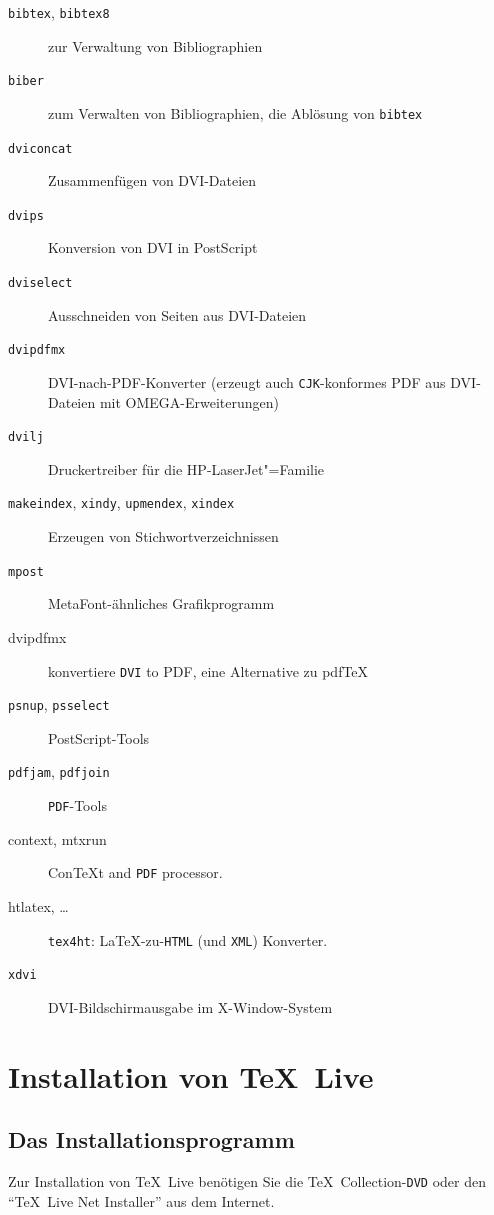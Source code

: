 \documentclass[12pt,ngerman,a4paper,fullparskip]{scrreprt}
\newcommand{\TL}{\TeX\ Live\xspace}
\newcommand{\acro}[1]{\texttt{#1}}
\newcommand{\cmdname}[1]{\texttt{#1}}
\def\TK{\TeX\ Collection}
\def\MF{MetaFont}
\providecommand*{\DVD}{\acro{DVD}\xspace}
\providecommand*{\PS}{Post\-Script\xspace}
\providecommand*{\dvi}{\acro{DVI}\xspace}
\begin{document}
\begin{description}
\item[\cmdname{bibtex}, \cmdname{bibtex8}]  zur Verwaltung von Bibliographien                  
\item[\cmdname{biber}] zum Verwalten von Bibliographien, die Ablösung von \cmdname{bibtex}
\item[\cmdname{dviconcat}]      Zusammenfügen von DVI-Dateien                 
\item[\cmdname{dvips}]          Konversion von DVI in {\PS}     
\item[\cmdname{dviselect}]     Ausschneiden von Seiten aus DVI-Dateien       
\item[\cmdname{dvipdfmx}]       DVI-nach-PDF-Konverter (erzeugt auch \acro{CJK}-konformes PDF aus
DVI-Dateien mit OMEGA-Erweiterungen)
\item[\cmdname{dvilj}]          Druckertreiber für die HP-LaserJet"=Familie    
\item[\cmdname{makeindex}, \cmdname{xindy}, \cmdname{upmendex}, \cmdname{xindex}] Erzeugen von Stichwortverzeichnissen
\item[\cmdname{mpost}]          \MF-ähnliches Grafikprogramm  
\item[dvipdfmx] konvertiere \dvi{} to PDF, eine Alternative zu pdf\TeX\
\item[\cmdname{psnup}, \cmdname{psselect}]          \PS-Tools
\item[\cmdname{pdfjam}, \cmdname{pdfjoin}]          \acro{PDF}-Tools
\item [context, mtxrun] Con\TeX{}t and \acro{PDF} processor.
\item [htlatex, \ldots] \cmdname{tex4ht}: \LaTeX{}-zu-\acro{HTML} (und 
\acro{XML}) Konverter.
\item[\cmdname{xdvi}]           DVI-Bildschirmausgabe im X-Window-System      
\end{description}


\chapter{Installation von \TL}\label{sec:install}

\section{Das Installationsprogramm}\label{sec:inst-start}

Zur Installation von \TL benötigen Sie die \TK-\DVD oder den \enquote{\TL{} Net Installer} aus dem Internet.
\end{document}
